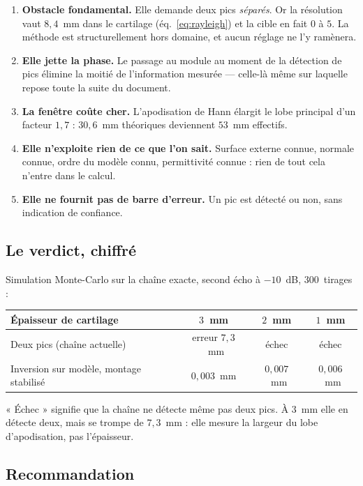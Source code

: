 \documentclass[11pt,a4paper]{article}
\begin{document}
\begin{enumerate}
\item \textbf{Obstacle fondamental.} Elle demande deux pics \emph{séparés}. Or
      la résolution vaut $8{,}4$~mm dans le cartilage (éq.~\ref{eq:rayleigh}) et
      la cible en fait $0$ à $5$. La méthode est structurellement hors domaine, et
      aucun réglage ne l'y ramènera.
\item \textbf{Elle jette la phase.} Le passage au module au moment de la
      détection de pics élimine la moitié de l'information mesurée --- celle-là
      même sur laquelle repose toute la suite du document.
\item \textbf{La fenêtre coûte cher.} L'apodisation de Hann élargit le lobe
      principal d'un facteur $1{,}7$ : $30{,}6$~mm théoriques deviennent
      $53$~mm effectifs.
\item \textbf{Elle n'exploite rien de ce que l'on sait.} Surface externe
      connue, normale connue, ordre du modèle connu, permittivité connue : rien
      de tout cela n'entre dans le calcul.
\item \textbf{Elle ne fournit pas de barre d'erreur.} Un pic est détecté ou non,
      sans indication de confiance.
\end{enumerate}

\subsection{Le verdict, chiffré}

Simulation Monte-Carlo sur la chaîne exacte, second écho à $-10$~dB,
$300$~tirages :

\begin{table}[h]
\centering
\begin{tabular}{lccc}
\toprule
Épaisseur de cartilage & $3$~mm & $2$~mm & $1$~mm \\
\midrule
Deux pics (chaîne actuelle) & erreur $7{,}3$~mm & échec & échec \\
Inversion sur modèle, montage stabilisé
   & $0{,}003$~mm & $0{,}007$~mm & $0{,}006$~mm \\
\bottomrule
\end{tabular}
\end{table}

\noindent
« Échec » signifie que la chaîne ne détecte même pas deux pics. À $3$~mm elle
en détecte deux, mais se trompe de $7{,}3$~mm : elle mesure la largeur du lobe
d'apodisation, pas l'épaisseur.

\subsection{Recommandation}
\end{document}
